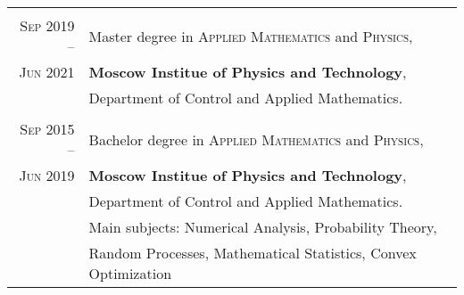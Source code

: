 \begin{center}
\begin{tabular}{r|p{10cm}}
    \multicolumn{2}{c}{} \\
    
    \textsc{Sep}  2019 -- 
    & Master degree in \textsc{Applied Mathematics} and \textsc{Physics},\\
    \textsc{Jun}  2021
    &\normalsize\textbf{Moscow Institue of Physics and Technology},\\
    &Department of Control and Applied Mathematics.\\
    
    \multicolumn{2}{c}{} \\
    
    \textsc{Sep}  2015 -- 
    & Bachelor degree in \textsc{Applied Mathematics} and \textsc{Physics},\\
    \textsc{Jun}  2019
    &\normalsize\textbf{Moscow Institue of Physics and Technology},\\
    &Department of Control and Applied Mathematics.\\
    &Main subjects: Numerical Analysis, Probability Theory,\\ 
    &Random Processes, Mathematical Statistics, Convex Optimization \\

\end{tabular}
\end{center}